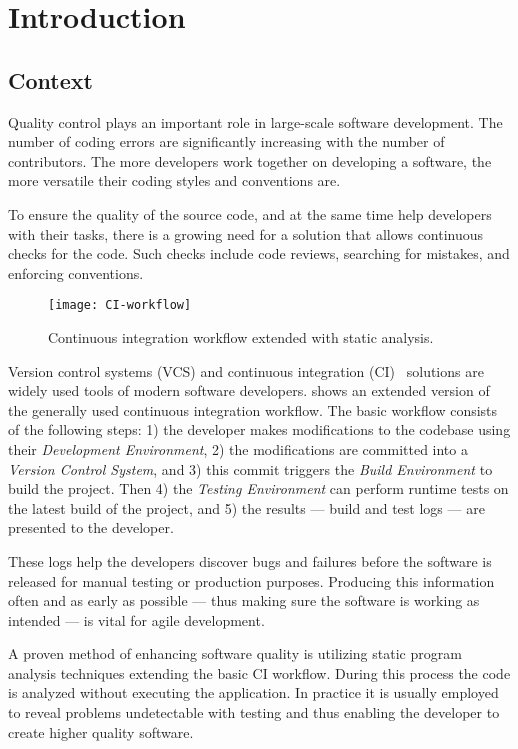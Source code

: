 \chapter{Introduction}
\label{chap:introduction}

\section{Context}
Quality control plays an important role in large-scale software development. The number of coding errors are significantly increasing with the number of contributors. The more developers work together on developing a software, the more versatile their coding styles and conventions are.

To ensure the quality of the source code, and at the same time help developers with their tasks, there is a growing need for a solution that allows continuous checks for the code. Such checks include code reviews, searching for mistakes, and enforcing conventions.

\begin{figure}[!ht]
	\centering
	\texttt{[image: CI-workflow]}
	\caption{Continuous integration workflow extended with static analysis.}
	\label{fig:CI-workflow}
\end{figure}

Version control systems (VCS) and continuous integration (CI)~\cite{CI} solutions are widely used tools of modern software developers.  shows an extended version of the generally used continuous integration workflow.
The basic workflow consists of the following steps: 1) the developer makes modifications to the codebase using their \textit{Development Environment}, 2) the modifications are committed into a \textit{Version Control System}, and 3) this commit triggers the \textit{Build Environment} to build the project. Then 4) the \textit{Testing Environment} can perform runtime tests on the latest build of the project, and 5) the results --- build and test logs --- are presented to the developer.

These logs help the developers discover bugs and failures before the software is released for manual testing or production purposes. Producing this information often and as early as possible --- thus making sure the software is working as intended --- is vital for agile development.

A proven method of enhancing software quality is utilizing static program analysis techniques extending the basic CI workflow. During this process the code is analyzed without executing the application. In practice it is usually employed to reveal problems undetectable with testing and thus enabling the developer to create higher quality software.


